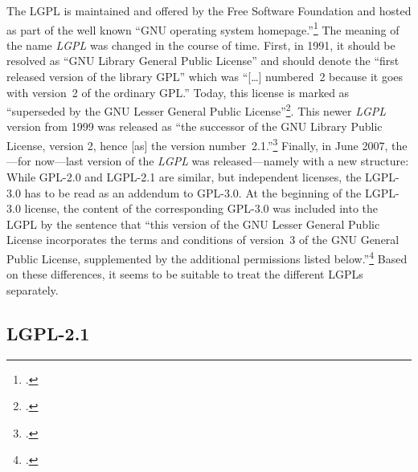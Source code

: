 The LGPL is maintained and offered by the Free Software Foundation and hosted as
part of the well known \enquote{GNU operating system
homepage.}\footcite[cf.][\nopage wp]{FsfGnuOsLicenses2011a} The meaning of the
name \emph{LGPL} was changed in the course of time. First, in 1991, it should be
resolved as \enquote{GNU Library General Public License} and should denote the
\enquote{first released version of the library GPL} which was \enquote{[\ldots]
numbered~2 because it goes with version~2 of the ordinary GPL.} Today, this
license is marked as \enquote{superseded by the GNU Lesser General Public
License}\footcite[cf.][\nopage wp]{Lgpl20FsfLicense1991a}. This newer
\emph{LGPL} version from 1999 was released as \enquote{the successor of the GNU
Library Public License, version 2, hence [as] the version
number~2.1.}\footcite[cf.][\nopage wp]{Lgpl21FsfLicense1999a} Finally, in June
2007, the---for now---last version of the \emph{LGPL} was released---namely with a
new structure: While GPL-2.0 and LGPL-2.1 are similar, but independent licenses,
the LGPL-3.0 has to be read as an addendum to GPL-3.0. At the beginning of the
LGPL-3.0 license, the content of the corresponding GPL-3.0 was included into
the LGPL by the sentence that \enquote{this version of the GNU Lesser General
Public License incorporates the terms and conditions of version~3 of the GNU
General Public License, supplemented by the additional permissions listed
below.}\footcite[cf.][\nopage wp]{Lgpl30FsfLicense2007a} Based on these
differences, it seems to be suitable to treat the different LGPLs separately.

\subsection{LGPL-2.1}

